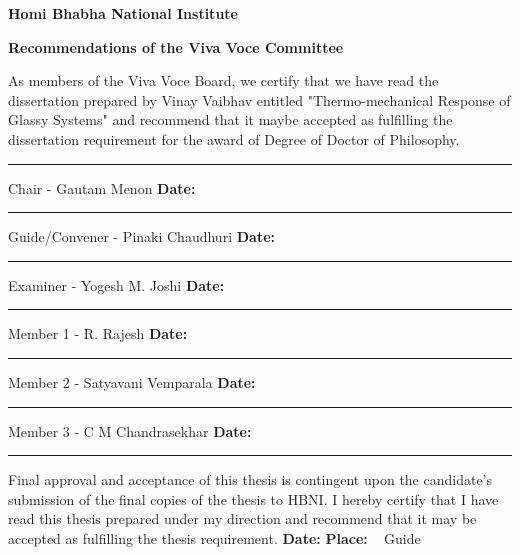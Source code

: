 \thispagestyle{plain}
\vskip -0.5cm
\centerline{{\bf{\LARGE Homi Bhabha National Institute}}}
%
\vskip 0.3cm
%
\centerline{{\bf {\large Recommendations of the Viva Voce Committee}}}
%
\vskip 0.3cm
%
As members of the Viva Voce Board, we certify that we have read the
dissertation prepared by Vinay Vaibhav entitled "Thermo-mechanical Response of Glassy Systems" and
recommend that it maybe accepted as fulfilling the dissertation
requirement for the award of Degree of Doctor of Philosophy.
%
\vskip 1.7cm
%
\hrule 
%
\vskip -0.1cm 
%
Chair - Gautam Menon \hfill {\bf Date:}\hspace{2.0cm} 
%
\vskip 1.3cm
%
\hrule
%
\vskip -0.1cm 
%
Guide/Convener - Pinaki Chaudhuri \hfill {\bf Date:}\hspace{2.0cm}
%
\vskip 1.3cm
%
\hrule
%
\vskip -0.1cm 
%
Examiner - Yogesh M. Joshi \hfill {\bf Date:}\hspace{2.0cm}
%
\vskip 1.3cm
%
\hrule
%
\vskip -0.1cm 
%
Member 1 - R. Rajesh \hfill {\bf Date:}\hspace{2.0cm}
%
\vskip 1.3cm
%
\hrule
%
\vskip -0.1cm 
%
Member 2 - Satyavani Vemparala \hfill {\bf Date:}\hspace{2.0cm}
%
%
\vskip 1.3cm
%
\hrule
%
\vskip -0.1cm 
%
Member 3 - C M Chandrasekhar \hfill {\bf Date:}\hspace{2.0cm}
%
\vskip 1.3cm
%
\hrule height 0.1cm
%
\vfill
%
\hspace{0.7cm} Final approval and acceptance of this thesis is
contingent upon the candidate's submission of the final copies of the
thesis to HBNI.
%
\vskip -0.2cm
%
\hspace{0.7cm} I hereby certify that I have read this thesis
prepared under my direction and recommend that it may be accepted as
fulfilling the thesis requirement.
%
\vfill
%
{\bf Date:} 
%
\vskip 0.3cm 
%
{\bf Place:} \hspace{1.0cm} ~\hspace{5.0cm} \hfill Guide \hspace{1.6cm}
%